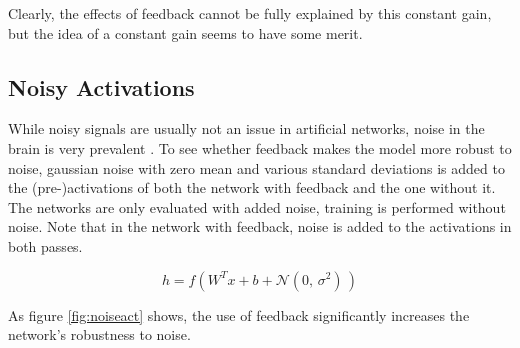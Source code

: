 \documentclass{article}
\begin{document}
  Clearly, the effects of feedback cannot be fully explained by this constant gain, but the idea of a constant gain seems to have some merit. 


\subsection{Noisy Activations} 
While noisy signals are usually not an issue in artificial networks, noise in the brain is very prevalent \cite{Faisal2008}. To see whether feedback makes the model more robust to noise, gaussian noise with zero mean and various standard deviations is added to the (pre-)activations of both the network with feedback and the one without it. The networks are only evaluated with added noise, training is performed without noise. Note that in the network with feedback, noise is added to the activations in both passes.    

		
	\begin{equation}
		h = f(W^T x + b + \mathcal{N}(0,\,\sigma^{2})\,)
	\end{equation}
	
	
	As figure \ref{fig:noiseact} shows, the use of feedback significantly increases the network's robustness to noise. 
\end{document}
